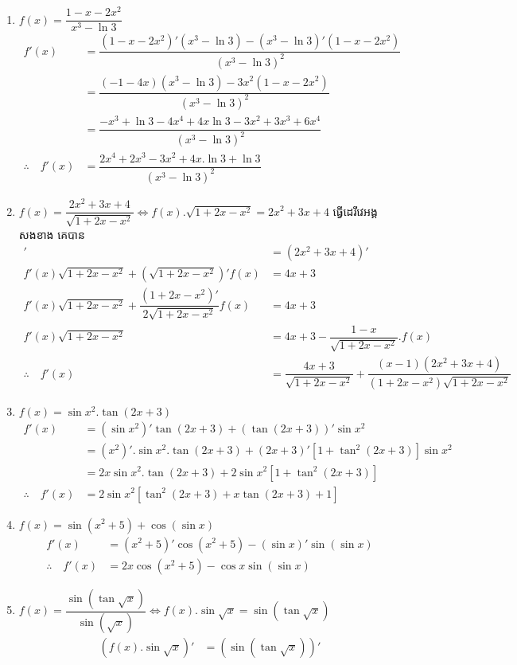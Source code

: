 \documentclass[12pt,fleqn]{book} %
\begin{document}
\begin{enumerate}
\item $f(x)=\dfrac{1-x-2x^2}{x^3-\ln 3}$
\begin{align*}
f'(x)&=\dfrac{(1-x-2x^2)'(x^3-\ln 3)-(x^3-\ln 3)'(1-x-2x^2)}{(x^3-\ln 3)^2}\\
&=\dfrac{(-1-4x)(x^3-\ln 3)-3x^2(1-x-2x^2)}{(x^3-\ln 3)^2}\\
&=\dfrac{-x^3+\ln 3-4x^4+4x\ln 3 -3x^2+3x^3+6x^4}{(x^3-\ln 3)^2}\\
\therefore \quad f'(x)&=\dfrac{2x^4+2x^3-3x^2+4x.\ln 3+\ln 3}{(x^3-\ln 3)^2}
\end{align*}
\item $f(x)=\dfrac{2x^2+3x+4}{\sqrt{1+2x-x^2}} \Longleftrightarrow f(x).\sqrt{1+2x-x^2}=2x^2+3x+4$ ធ្វើដេរីវេអង្គសងខាង គេបាន 
\begin{align*}
[f(x)\sqrt{1+2x-x^2}]'&=(2x^2+3x+4)'\\
f'(x)\sqrt{1+2x-x^2}+(\sqrt{1+2x-x^2})'f(x)&=4x+3\\
f'(x)\sqrt{1+2x-x^2}+\dfrac{(1+2x-x^2)'}{2\sqrt{1+2x-x^2}}f(x)&=4x+3\\
f'(x)\sqrt{1+2x-x^2}&=4x+3-\dfrac{1-x}{\sqrt{1+2x-x^2}}.f(x)\\
\therefore \quad f'(x)&=\dfrac{4x+3}{\sqrt{1+2x-x^2}}+\dfrac{(x-1)(2x^2+3x+4)}{(1+2x-x^2)\sqrt{1+2x-x^2}}
\end{align*}
\item $f(x)=\sin x^2.\tan (2x+3)$
\begin{align*}
f'(x)&= (\sin x^2)'\tan (2x+3)+(\tan (2x+3))'\sin x^2\\
&=(x^2)'.\sin x^2. \tan (2x+3)+(2x+3)'[1+\tan^2 (2x+3)]\sin x^2\\
&=2x\sin x^2 .\tan (2x+3)+2\sin x^2 [1+\tan^2 (2x+3)]\\
\therefore \quad f'(x)&=2\sin x^2 [\tan^2 (2x+3)+x\tan (2x+3)+1]
\end{align*}
\item $f(x)=\sin (x^2+5)+\cos (\sin x)$
\begin{align*}
f'(x)&=(x^2+5)'\cos (x^2+5)-(\sin x)'\sin (\sin x)\\
\therefore \quad f'(x)&=2x\cos (x^2+5)-\cos x\sin (\sin x)
\end{align*}
\item $f(x)=\dfrac{\sin (\tan \sqrt{x})}{\sin (\sqrt{x})}\Longleftrightarrow f(x).\sin \sqrt{x}=\sin (\tan \sqrt{x})$
\begin{align*}
\left(f(x).\sin \sqrt{x}\right)'&=\left(\sin (\tan \sqrt{x})\right)'\\

\end{align*}
\end{enumerate}
\end{document}
